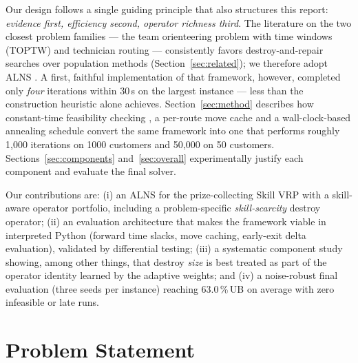 \documentclass[10pt, a4paper]{article}
\newcommand{\ub}{\%\,UB}
\begin{document}
Our design follows a single guiding principle that also structures this
report: \emph{evidence first, efficiency second, operator richness third}.
The literature on the two closest problem families --- the team orienteering
problem with time windows (TOPTW) and technician routing --- consistently
favors destroy-and-repair searches over population methods
(Section~\ref{sec:related}); we therefore adopt ALNS
\cite{ropke2006,pisinger2007}. A first, faithful implementation of that
framework, however, completed only \emph{four} iterations within 30\,s on the
largest instance --- less than the construction heuristic alone achieves.
Section~\ref{sec:method} describes how constant-time feasibility checking
\cite{savelsbergh1992}, a per-route move cache and a wall-clock-based
annealing schedule convert the same framework into one that performs roughly
1{,}000 iterations on 1000 customers and 50{,}000 on 50 customers.
Sections~\ref{sec:components} and~\ref{sec:overall} experimentally justify
each component and evaluate the final solver.

Our contributions are: (i) an ALNS for the prize-collecting Skill VRP with a
skill-aware operator portfolio, including a problem-specific
\emph{skill-scarcity} destroy operator; (ii) an evaluation architecture that
makes the framework viable in interpreted Python (forward time slacks, move
caching, early-exit delta evaluation), validated by differential testing;
(iii) a systematic component study showing, among other things, that destroy
\emph{size} is best treated as part of the operator identity learned by the
adaptive weights; and (iv) a noise-robust final evaluation (three seeds per
instance) reaching 63.0\,\ub{} on average with zero infeasible or late runs.

\section{Problem Statement}\label{sec:problem}
\end{document}
